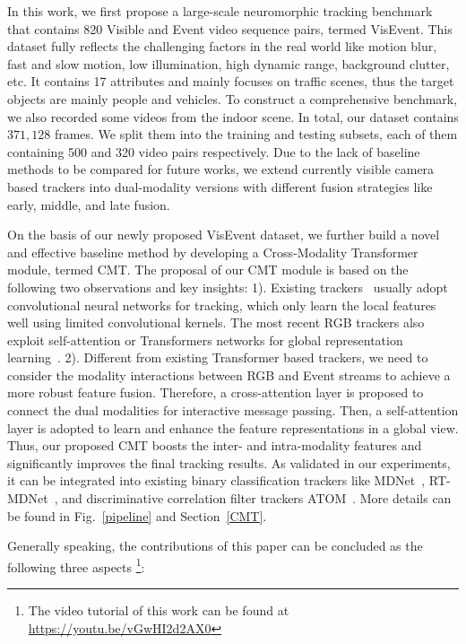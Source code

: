 \documentclass[journal]{IEEEtran}
\begin{document}
In this work, we first propose a large-scale neuromorphic tracking benchmark that contains 820 Visible and Event video sequence pairs, termed VisEvent. This dataset fully reflects the challenging factors in the real world like motion blur, fast and slow motion, low illumination, high dynamic range, background clutter, etc. It contains 17 attributes and mainly focuses on traffic scenes, thus the target objects are mainly people and vehicles. To construct a comprehensive benchmark, we also recorded some videos from the indoor scene. In total, our dataset contains $371,128$ frames. We split them into the training and testing subsets, each of them containing 500 and 320 video pairs respectively. Due to the lack of baseline methods to be compared for future works, we extend currently visible camera based trackers into dual-modality versions with different fusion strategies like early, middle, and late fusion. 


On the basis of our newly proposed VisEvent dataset, we further build a novel and effective baseline method by developing a Cross-Modality Transformer module, termed CMT. 
The proposal of our CMT module is based on the following two observations and key insights: 
1). Existing trackers~\cite{Nam2015Learning, Jung_2018_ECCV, danelljan2019atom} usually adopt convolutional neural networks for tracking, which only learn the local features well using limited convolutional kernels. The most recent RGB trackers also exploit self-attention or Transformers networks for global representation learning~\cite{yan2022unificationTrack, chen2021TransT}. 
2). Different from existing Transformer based trackers, we need to consider the modality interactions between RGB and Event streams to achieve a more robust feature fusion. Therefore, a cross-attention layer is proposed to connect the dual modalities for interactive message passing. Then, a self-attention layer is adopted to learn and enhance the feature representations in a global view. Thus, our proposed CMT boosts the inter- and intra-modality features and significantly improves the final tracking results. As validated in our experiments, it can be integrated into existing binary classification trackers like MDNet~\cite{Nam2015Learning}, RT-MDNet~\cite{Jung_2018_ECCV}, and discriminative correlation filter trackers ATOM~\cite{danelljan2019atom}. More details can be found in Fig.~\ref{pipeline} and Section~\ref{CMT}. 



Generally speaking, the contributions of this paper can be concluded as the following three aspects \footnote{The video tutorial of this work can be found at \url{https://youtu.be/vGwHI2d2AX0}}:
\end{document}
